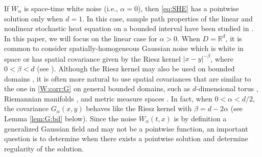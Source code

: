 \documentclass[reqno]{amsart}
\newcommand{\R}{\mathbb R}
\newcommand{\E}{\mathbb E}
\newcommand{\1}{\mathbf 1}
\numberwithin{equation}{section}
\theoremstyle{definition}
\begin{document}




If $\dot{W}_\alpha$ is space-time white noise (i.e., $\alpha=0$), then
\eqref{eq:SHE} has a pointwise solution only when $d=1$.
In this case, sample path properties of the linear and nonlinear stochastic heat equation on a bounded interval have been studied in \cite{HL26}.
In this paper, we will focus on the linear case for $\alpha>0$.
%
%
%
%
%
When $D=\R^d$, it is common to consider spatially-homogeneous Gaussian noise which is white in space or has spatial covariance given by the Riesz kernel $|x-y|^{-\beta}$, where $0<\beta<d$ (see \cite{Dalang}).
Although the Riesz kernel may also be used on bounded domains \cite{CCL24}, it is often more natural to use spatial covariances that are similar to the one in \eqref{W:corr:G} on general bounded domains, such as $d$-dimensional torus \cite{CCV}, Riemannian manifolds \cite{CO25}, and metric measure spaces \cite{BCHOTW}.
In fact, when $0<\alpha<d/2$, the covariance $G_\alpha(x,y)$ behaves like the Riesz kernel with $\beta = d-2\alpha$ (see Lemma \ref{lem:G:bd} below).
Since the noise $\dot{W}_\alpha(t,x)$ is by definition a generalized Gaussian field and may not be a pointwise function, an important question is to determine when there exists a pointwise solution and determine regularity of the solution.
\end{document}
